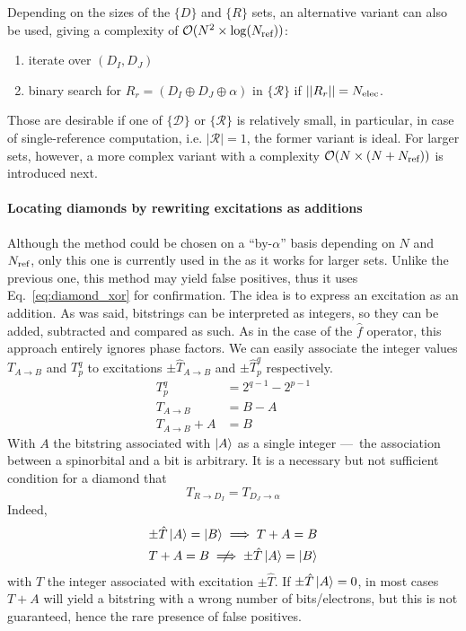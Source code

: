 \documentclass[./thesis.tex]{subfiles}
\begin{document}
Depending on the sizes of the $\{D\}$ and $\{R\}$ sets, an alternative variant can also be used, giving a complexity of $\mathcal{O}(N^2 \times \log({N_\text{ref}}))$:
\begin{enumerate}
\item
iterate over $(D_I, D_J)$
\item
binary search for $R_r = (D_I \oplus D_J \oplus \alpha)$ in $\{\mathcal{R}\}$ if $||R_r|| = {N_\text{elec}}$.
\end{enumerate}

Those are desirable if one of $\{\mathcal{D}\}$ or $\{\mathcal{R}\}$ is relatively small, in particular, in case of single-reference computation, i.e. $|\mathcal{R}|=1$, the former variant is ideal. For larger sets, however, a more complex variant with a complexity $\mathcal{O}(N \times (N+{N_\text{ref}}))$ is introduced next.


\paragraph{Locating diamonds by rewriting excitations as additions}
Although the method could be chosen on a ``by-$\alpha$'' basis depending on $N$ and ${N_\text{ref}}$, only this one is currently used in the \QP as it works for larger sets.
Unlike the previous one, this method may yield false positives, thus it uses Eq.~\eqref{eq:diamond_xor} for confirmation.
The idea is to express an excitation as an addition. As was said, bitstrings can be interpreted as integers, so they can be added, subtracted and compared as such. As in the case of the $\hat f$ operator, this approach entirely ignores phase factors. We can easily associate the integer values $T_{A \rightarrow B}$ and $T_p^q$ to excitations $\pm \hat T_{A \rightarrow B}$ and $\pm \hat T_p^q$ respectively.
\begin{align}
T_p^q & = 2^{q-1} - 2^{p-1} \\
T_{A \rightarrow B} & =  B - A \\
T_{A \rightarrow B} + A & = B 
\end{align}
With $A$ the bitstring associated with $\ket A$ as a single integer ---~the association between a spinorbital and a bit is arbitrary. It is a necessary but not sufficient condition for a diamond that
\begin{equation}
T_{R \rightarrow D_I} = T_{D_J \rightarrow \alpha}
\end{equation}
Indeed,
\begin{align}
\pm \hat T \ket A = \ket B \implies  T + A = B\\
T + A = B \centernot \implies \pm \hat T \ket A = \ket B
\end{align}
with $T$ the integer associated with excitation $\pm \hat T$. If $\pm \hat T \ket A = 0$, in most cases $T + A$ will yield a bitstring with a wrong number of bits/electrons, but this is not guaranteed, hence the rare presence of false positives.
\end{document}
